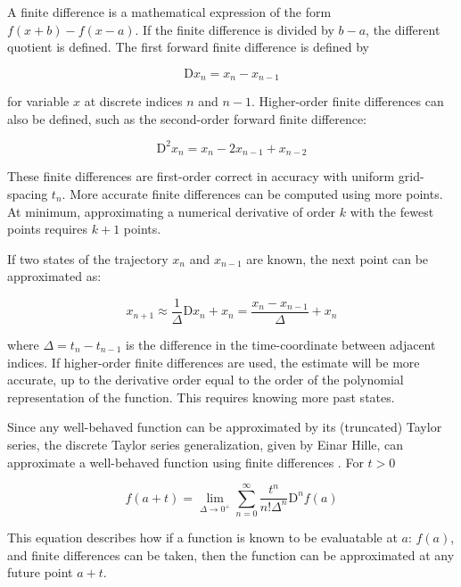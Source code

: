 \documentclass{article}
\begin{document}
A finite difference is a mathematical expression of the form $f(x + b) - f(x - a)$.
If the finite difference is divided by $b-a$, the different quotient is defined.
The first forward finite difference is defined by

\begin{equation}
  \mathrm{D}x_n = x_n - x_{n-1}
\end{equation}

for variable $x$ at discrete indices $n$ and $n-1$.
Higher-order finite differences can also be defined, such as the second-order forward finite difference:

\begin{equation}
  \mathrm{D}^2 x_n = x_n - 2 x_{n-1} + x_{n-2}
\end{equation}

These finite differences are first-order correct in accuracy with uniform grid-spacing $t_n$.
More accurate finite differences can be computed using more points.
At minimum, approximating a numerical derivative of order $k$ with the fewest points requires $k+1$ points.

If two states of the trajectory $x_n$ and $x_{n-1}$ are known, the next point can be approximated as:

\begin{equation}
  x_{n+1} \approx \frac{1}{\Delta} \mathrm{D}x_n + x_n = \frac{x_n - x_{n-1}}{\Delta} + x_n
\end{equation}

where $\Delta = t_n - t_{n-1}$ is the difference in the time-coordinate between adjacent indices.
If higher-order finite differences are used, the estimate will be more accurate,
up to the derivative order equal to the order of the polynomial representation of the function.
This requires knowing more past states.

Since any well-behaved function can be approximated by its (truncated) Taylor series,
the discrete Taylor series generalization, given by Einar Hille,
can approximate a well-behaved function using finite differences \citep{hilleFunctionalAnalysisSemigroups1957}.
For $t > 0$

\begin{equation}
  \label{eq:hille}
  f(a + t) = \lim_{\Delta \rightarrow 0^+} \sum_{n=0}^{\infty} \frac{t^n}{n! \Delta^n} \mathrm{D}^n f(a)
\end{equation}

This equation describes how if a function is known to be evaluatable at $a$: $f(a)$,
and finite differences can be taken,
then the function can be approximated at any future point $a + t$.
\end{document}

